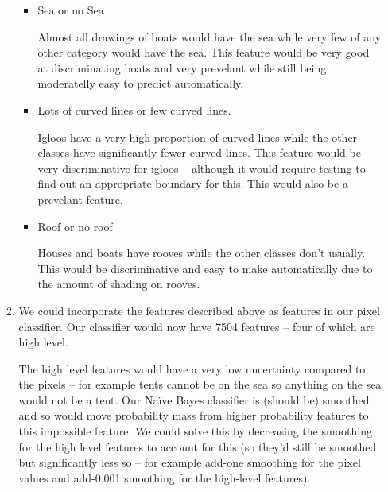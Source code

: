 \documentclass[10pt, a4paper]{article}
\begin{document}
\begin{enumerate}[label=(\alph*)]
\begin{enumerate}
\begin{itemize}
\item Sea or no Sea

Almost all drawings of boats would have the sea while very few of any other category would have the sea. This 
feature would be very good at discriminating boats and very prevelant while still being moderatelly easy to 
predict automatically.

\item Lots of curved lines or few curved lines.

Igloos have a very high proportion of curved lines while the other classes have significantly fewer curved lines. 
This feature would be very discriminative for igloos -- although it would require testing to find out an appropriate 
boundary for this. This would also be a prevelant feature.

\item Roof or no roof

Houses and boats have rooves while the other classes don't usually. This would be discriminative and easy to make automatically  
due to the amount of shading on rooves.

\end{itemize}

\item We could incorporate the features described above as features in our pixel classifier. Our classifier 
would now have 7504 features -- four of which are high level.

The high level features would have a very low uncertainty compared to the pixels -- for example tents cannot be 
on the sea so anything on the sea would not be a tent. Our Na\"ive Bayes classifier is (should be) smoothed and so 
would move probability mass from higher probability features to this impossible feature. 
We could solve this by decreasing the smoothing for the high level features to account for this (so they'd 
still be smoothed but significantly less so -- for example add-one smoothing for the pixel values and add-0.001 smoothing 
for the high-level features).

\end{enumerate}

\end{enumerate}
\end{document}
